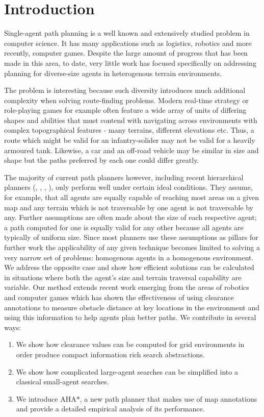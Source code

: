 \section{Introduction}
Single-agent path planning is a well known and extensively studied problem in computer science.
It has many applications such as logistics, robotics and more recently, computer games. 
Despite the large amount of progress that has been made in this area, to date, very little work has focused specifically on addressing planning for diverse-size agents in heterogenous terrain environments. 
\par \indent
The problem is interesting because such diversity introduces much additional complexity when solving route-finding problems.
Modern real-time strategy or role-playing games for example often feature a wide array of units of differing shapes and abilities that must contend with navigating across environments with complex topographical features - many terrains, different elevations etc. 
Thus, a route which might be valid for an infantry-solider may not be valid for a heavily armoured tank. 
Likewise, a car and an off-road vehicle may be similar in size and shape but the paths preferred by each one could differ greatly. 
\par \indent
The majority of current path planners however, including recent hierarchical planners (\cite{botea04}, \cite{sturtevant05}, \cite{demyen07}, \cite{geraerts07}), only perform well under certain ideal conditions. 
They assume, for example, that all agents are equally capable of reaching most areas on a given map and any terrain which is not traversable by one agent is not traversable by any. 
Further assumptions are often made about the size of each respective agent; a path computed for one is equally valid for any other because all agents are typically of uniform size. 
Since most planners use these assumptions as pillars for further work the applicability of any given technique becomes limited to solving a very narrow set of problems: homogenous agents in a homogenous environment. \\
We address the opposite case and show how efficient solutions can be calculated in situations where both the agent's size and terrain traversal capability are variable. Our method extends recent work emerging from the areas of robotics and computer games which has shown the effectiveness of using clearance annotations to measure obstacle distance at key locations in the environment and using this information to help agents plan better paths. We contribute in several ways:
\begin{enumerate}
\item{We show how clearance values can be computed for grid environments in order produce compact information rich search abstractions.}
\item{We show how complicated large-agent searches can be simplified into a classical small-agent searches.}
\item{We introduce AHA*, a new path planner that makes use of map annotations and provide a detailed empirical analysis of its performance. }
\end{enumerate} 

